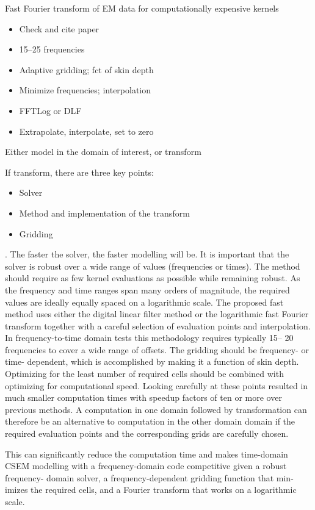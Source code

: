 \documentclass[xcolor=svgnames, usepdftitle=false, aspectratio=169]{beamer}
\begin{document}
\begin{frame}
  {Fast Fourier transform of EM data for computationally expensive kernels}

  \begin{itemize}
    \item Check and cite paper
    \item 15--25 frequencies
    \item Adaptive gridding; fct of skin depth
    \item Minimize frequencies; interpolation
    \item FFTLog or DLF
    \item Extrapolate, interpolate, set to zero
  \end{itemize}

  Either model in the domain of interest, or transform

  If transform, there are three key points:
  \begin{itemize}
    \item Solver
    \item Method and implementation of the transform
    \item Gridding
  \end{itemize}

  . The faster the solver, the faster modelling will be. It is important that
the solver is robust over a wide range of values (frequencies or times). The method should
require as few kernel evaluations as possible while remaining robust. As the frequency and
time ranges span many orders of magnitude, the required values are ideally equally spaced
on a logarithmic scale. The proposed fast method uses either the digital linear filter method
or the logarithmic fast Fourier transform together with a careful selection of evaluation points
and interpolation. In frequency-to-time domain tests this methodology requires typically 15–
20 frequencies to cover a wide range of offsets. The gridding should be frequency- or time-
dependent, which is accomplished by making it a function of skin depth. Optimizing for the
least number of required cells should be combined with optimizing for computational speed.
Looking carefully at these points resulted in much smaller computation times with speedup
factors of ten or more over previous methods. A computation in one domain followed by
transformation can therefore be an alternative to computation in the other domain domain if
the required evaluation points and the corresponding grids are carefully chosen.


This can significantly reduce the
computation time and makes time-domain CSEM modelling with
a frequency-domain code competitive given a robust frequency-
domain solver, a frequency-dependent gridding function that min-
imizes the required cells, and a Fourier transform that works on
a logarithmic scale.


\end{frame}
\end{document}
